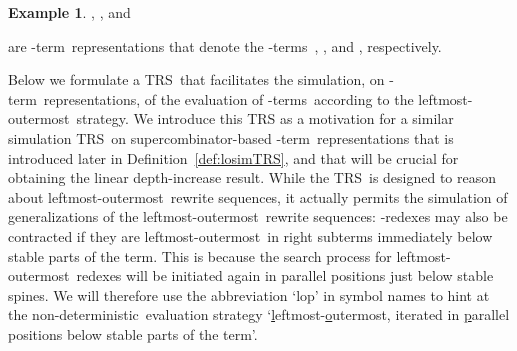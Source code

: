 \documentclass[
submission
]{dmtcs-episciences-tampered}
\newcommand{\nb}{\nobreakdash}
\newcommand{\TRS}{TRS}
\newcommand{\lambdaterm}{\nb-term}
\newcommand{\lambdaterms}{\lambdaterm{s}}
\newcommand{\betaredex}{\nb-re\-dex}
\newcommand{\lo}{left\-most-outer\-most}
\newcommand{\nondeterministic}{non-de\-ter\-min\-istic}
\theoremstyle{plain}
\theoremstyle{definition}
\newtheorem{example}[theorem]{Example}
\begin{document}
\begin{example}
  ,
  , and
  
  are \lambdaterm\ representations that denote the \lambdaterms\
  ,
  ,
  and 
  ,
  respectively.
\end{example}
    
Below we formulate a \TRS\ that facilitates the simulation, on \lambdaterm\ representations,
of the evaluation of \lambdaterms\ according to the \lo\ strategy.
We introduce this TRS as a motivation for a similar simulation \TRS\ on super\-com\-bi\-na\-tor-based \lambdaterm\ representations
that is introduced later in Definition~\ref{def:losimTRS}, and that will be crucial for obtaining the linear depth-increase result. 
While the \TRS\ is designed to reason about \lo\ rewrite sequences, it actually permits the simulation of generalizations of the \lo\ rewrite sequences:
\betaredex{es} may also be contracted if they are \lo\ in right subterms immediately below stable parts of the term. 
This is because the search process for \lo\ redexes will be initiated again in parallel positions just below stable spines. 
We will therefore use the abbreviation `lop' in symbol names to hint at 
the \nondeterministic\ evaluation strategy `\underline{l}eftmost-\underline{o}utermost, iterated in \underline{p}arallel positions below stable parts of the term'. 
\end{document}
